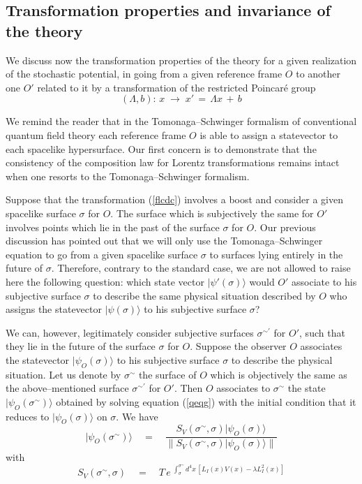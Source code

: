 \documentclass[12pt]{article}
\begin{document}
\subsection{Transformation properties and invariance of the theory}
\label{sec94}

We discuss now the transformation properties of the theory for a
given realization of the stochastic potential, in going from a
given reference frame $O$ to another one $O'$ related to it by a
transformation of the restricted Poincar\'e group
\begin{equation} \label{flcdc}
(\Lambda,b):\, x\; \rightarrow \; x'\, = \, \Lambda x\, + \, b
\end{equation}

We remind the reader that in the Tomonaga--Schwinger formalism of
conventional quantum field theory each reference frame $O$ is able
to assign a statevector to each spacelike hypersurface. Our first
concern is to demonstrate that the consistency of the composition
law for Lorentz transformations remains intact when one resorts to
the Tomonaga--Schwinger formalism.

Suppose that the transformation (\ref{flcdc}) involves a boost and
consider a given spacelike surface $\sigma$ for $O$. The surface
which is subjectively the same for $O'$ involves points which lie
in the past of the surface $\sigma$ for $O$. Our previous
discussion has pointed out that we will only use the
Tomonaga--Schwinger equation to go from a given spacelike surface
$\sigma$ to surfaces lying entirely in the future of $\sigma$.
Therefore, contrary to the standard case, we are not allowed to
raise here the following question: which state vector
$|\psi'(\sigma)\rangle$ would $O'$ associate to his subjective
surface $\sigma$ to describe the same physical situation described
by $O$ who assigns the statevector $|\psi(\sigma)\rangle$ to his
subjective surface $\sigma$?

We can, however, legitimately consider subjective surfaces
$\sigma{}^{\sim\prime}$ for $O'$, such that they lie in the future
of the surface $\sigma$ for $O$. Suppose the observer $O$
associates the statevector $|\psi_{O}(\sigma)\rangle$ to his
subjective surface $\sigma$ to describe the physical situation.
Let us denote by $\sigma{}^{\sim}$ the surface of $O$ which is
objectively the same as the above--mentioned surface
$\sigma{}^{\sim\prime}$ for $O'$. Then $O$ associates to
$\sigma{}^{\sim}$ the state $|\psi_{O}(\sigma{}^{\sim})\rangle$
obtained by solving equation (\ref{qeqg}) with the initial
condition that it reduces to $|\psi_{O}(\sigma)\rangle$ on
$\sigma$. We have
\begin{equation}
|\psi_{O}(\sigma{}^{\sim})\rangle \quad = \quad \frac{S_{V}
(\sigma{}^{\sim}, \sigma) |\psi_{O}(\sigma)\rangle}{ \|
S_{V}(\sigma{}^{\sim}, \sigma) |\psi_{O}(\sigma)\rangle\|}
\end{equation}
with
\begin{equation} \label{fqfl}
S_{V}(\sigma{}^{\sim}, \sigma) \quad = \quad T\, e^{\displaystyle
\; \int_{\sigma}^{\sigma{}^{\sim}} d^{4}x\, [L_{I}(x) V(x) -
\lambda L_{I}^{2}(x)]}
\end{equation}
\end{document}
